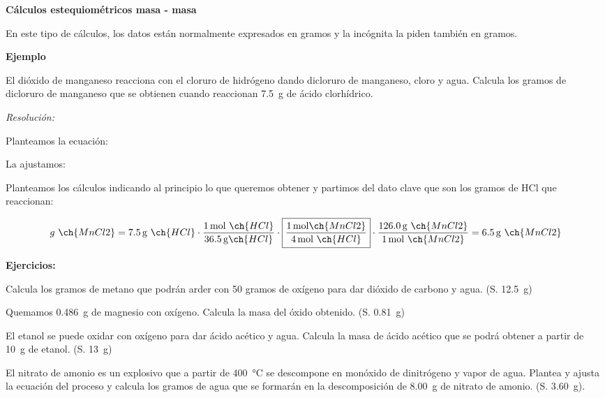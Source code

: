 \documentclass[
  spanish,
]{article}
\begin{document}
\textbf{Cálculos estequiométricos masa - masa}

En este tipo de cálculos, los datos están normalmente expresados en
gramos y la incógnita la piden también en gramos.

\textbf{Ejemplo}

El dióxido de manganeso reacciona con el cloruro de hidrógeno dando
dicloruro de manganeso, cloro y agua. Calcula los gramos de dicloruro de
manganeso que se obtienen cuando reaccionan \qty{7,5}{\g} de ácido
clorhídrico.

\emph{Resolución:}

Planteamos la ecuación: 

La ajustamos: 

Planteamos los cálculos indicando al principio lo que queremos obtener y
partimos del dato clave que son los gramos de HCl que reaccionan:

\[g\ \ch{MnCl2} = \qty{7,5}{\g}\ \ch{HCl} \cdot \frac{\qty{1}{\mol}\ \ch{HCl}}{\qty{36.5}{\g} \ch{HCl}} \cdot
\boxed{ \frac{\qty{1}{\mol} \ch{MnCl2}}{\qty{4}{\mol}\ \ch{HCl}} } \cdot \frac{\qty{126.0}{\g}\ \ch{MnCl2}}{\qty{1}{\mol}\ \ch{MnCl2}} = \qty{6.5}{\g}\ \ch{MnCl2}\]

\textbf{Ejercicios:}

\begin{exercise}Calcula los gramos de metano que podrán arder con 50
gramos de oxígeno para dar dióxido de carbono y agua. (S.
\qty{12,5}{\g})\end{exercise}

\begin{exercise}Quemamos \qty{0,486}{\g} de magnesio con oxígeno.
Calcula la masa del óxido obtenido. (S. \qty{0,81}{\g})\end{exercise}

\begin{exercise}El etanol se puede oxidar con oxígeno para dar ácido
acético y agua. Calcula la masa de ácido acético que se podrá obtener a
partir de \qty{10}{\g} de etanol. (S. \qty{13}{\g})\end{exercise}

\begin{exercise}El nitrato de amonio es un explosivo que a partir de
\qty{400}{\degreeCelsius} se descompone en monóxido de dinitrógeno y
vapor de agua. Plantea y ajusta la ecuación del proceso y calcula los
gramos de agua que se formarán en la descomposición de \qty{8,00}{\g} de
nitrato de amonio. (S. \qty{3,60}{\g}).\end{exercise}
\end{document}
